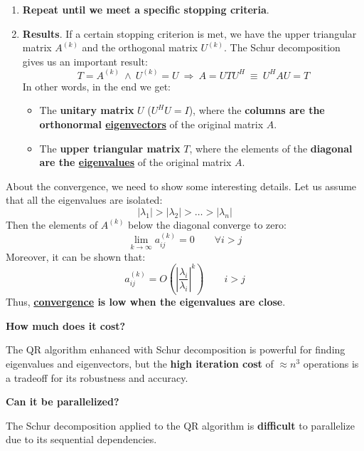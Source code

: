 \begin{enumerate}
    \item \textbf{Repeat until we meet a specific stopping criteria}.
    
    \item \textbf{Results}. If a certain stopping criterion is met, we have the upper triangular matrix $A^{\left(k\right)}$ and the orthogonal matrix $U^{\left(k\right)}$. The Schur decomposition gives us an important result:
    \begin{equation*}
        T = A^{\left(k\right)} \: \land \: U^{\left(k\right)} = U \: \Longrightarrow \: A = U T U^{H} \: \equiv \: U^{H} A U = T
    \end{equation*}
    In other words, in the end we get:
    \begin{itemize}
        \item The \textbf{unitary matrix} $U$ ($U^{H}U = I$), where the \textbf{columns are the orthonormal \underline{eigenvectors}} of the original matrix $A$.
        
        \item The \textbf{upper triangular matrix} $T$, where the elements of the \textbf{diagonal are the \underline{eigenvalues}} of the original matrix $A$.
    \end{itemize}
\end{enumerate}
About the convergence, we need to show some interesting details. Let us assume that all the eigenvalues are isolated:
\begin{equation*}
    \left|\lambda_{1}\right| > \left|\lambda_{2}\right| > \dots > \left|\lambda_{n}\right|
\end{equation*}
Then the elements of $A^{\left(k\right)}$ below the diagonal converge to zero:
\begin{equation*}
    \lim\limits_{k \rightarrow \infty} a_{ij}^{\left(k\right)} = 0 \hspace{2em} \forall i > j
\end{equation*}
Moreover, it can be shown that:
\begin{equation*}
    a_{ij}^{\left(k\right)} = O\left(
        \left|\dfrac{\lambda_{i}}{\lambda_{i}}\right|^{k}
    \right) \hspace{2em} i > j
\end{equation*}
Thus, \textbf{\underline{convergence} is low when the eigenvalues are close}.

\highspace
\begin{flushleft}
    \textcolor{Red2}{ \textbf{How much does it cost?}}
\end{flushleft}
The QR algorithm enhanced with Schur decomposition is powerful for finding eigenvalues and eigenvectors, but the \textbf{high iteration cost} of $\approx n^{3}$ operations is a tradeoff for its robustness and accuracy.

\highspace
\begin{flushleft}
    \textcolor{Green3}{ \textbf{Can it be parallelized?}}
\end{flushleft}
The Schur decomposition applied to the QR algorithm is \textbf{difficult} to parallelize due to its sequential dependencies.